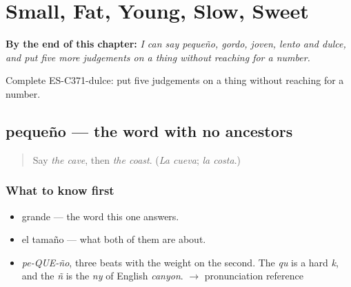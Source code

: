 
\chapter{Small, Fat, Young, Slow, Sweet}
\label{ch:pequeno-y-gordo}

\begin{chapteropening}
\textbf{By the end of this chapter:} \emph{I can say pequeño, gordo, joven, lento and dulce, and put five more judgements on a thing without reaching for a number.}

Complete ES-C371-dulce: put five judgements on a thing without reaching for a number.
\end{chapteropening}

\section[pequeño]{pequeño — the word with no ancestors}

\label{lesson:ES-C371-pequeno}



\begin{quote}
Say \emph{the cave}, then \emph{the coast}. (\emph{La cueva}; \emph{la costa}.)
\end{quote}

\subsection*{What to know first}
\begin{itemize}
\raggedright
  \item grande — the word this one answers.
  \item el tamaño — what both of them are about.
\end{itemize}

\begin{sounds}
\begin{itemize}
\raggedright
  \item \emph{pe-QUE-ño}, three beats with the weight on the second. The \emph{qu} is a hard \emph{k}, and the \emph{ñ} is the \emph{ny} of English \emph{canyon}. $\to$ pronunciation reference
\end{itemize}
\end{sounds}

